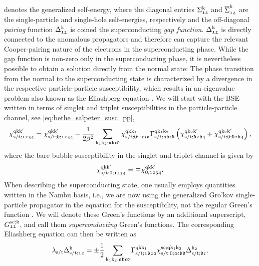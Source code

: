 \documentclass[\main/main.tex]{subfiles}
\begin{document}
denotes the generalized self-energy, where the diagonal entries $\Sigma_{\mathfrak{12}}^{\text{k}}$ and $\overline{\Sigma}_{\mathfrak{12}}^{\text{k}}$ are the single-particle and single-hole self-energies, respectively and the off-diagonal \textit{pairing} function $\Delta_{\mathfrak{12}}^{\text{k}}$ is coined the superconducting \textit{gap function}. $\Delta_{\mathfrak{12}}^{\text{k}}$ is directly connected to the anomalous propagators and therefore can capture the relevant Cooper-pairing nature of the electrons in the superconducting phase. While the gap function is non-zero only in the superconducting phase, it is nevertheless possible to obtain a solution directly from the normal state: The phase transition from the normal to the superconducting state is characterized by a divergence in the respective particle-particle susceptibility, which results in an eigenvalue problem also known as the Eliashberg equation \cite{Berges2016}. We will start with the BSE written in terms of singlet and triplet susceptibilities in the particle-particle channel, see \eqref{eq:bethe_salpeter_susc_pp},
\begin{align}
\chi^{\text{q}\text{k}\text{k}'}_{\text{s}/\text{t};\mathfrak{1234}}=\chi^{\text{q}\text{k}\text{k}'}_{\text{s}/\text{t};0;\mathfrak{1234}}-\frac{1}{2\beta^2}\sum_{\text{k}_1\text{k}_2;\mathfrak{abcd}}\chi^{\text{q}\text{k}\text{k}_1}_{\text{s}/\text{t};0;\mathfrak{1c3a}}\Gamma^{\text{q}\text{k}_1\text{k}_2}_{\text{s}/\text{t};\mathfrak{abcd}}\left (\chi^{\text{q}\text{k}_2\text{k}'}_{\text{s}/\text{t};\mathfrak{d2b4}}+\chi^{\text{q}\text{k}_2\text{k}'}_{\text{s}/\text{t};0;\mathfrak{d2b4}}\right ),
\end{align}
where the bare bubble susceptibility in the singlet and triplet channel is given by \cite{Gingras2019}
\begin{align}
	\chi^{\text{q}\text{k}\text{k}'}_{\text{s}/\text{t};0;\mathfrak{1234}}=\mp\chi^{\text{q}\text{k}\text{k}'}_{0;\mathfrak{1234}}.
\end{align}
When describing the superconducting state, one usually employs quantities written in the Nambu basis, i.e., we are now using the generalized Gro'kov single-particle propagator in the equation for the susceptibility, not the regular Green's function \cite{Nambu1950, Putzer2023}. We will denote these Green's functions by an additional superscript, $G^{\text{sc};\text{k}}_{\mathfrak{12}}$, and call them \textit{superconducting} Green's functions. The corresponding Eliashberg equation can then be written as
\begin{align}\label{eq:full_eliashberg}
	\lambda_{\text{s}/\text{t}}\Delta_{\text{s}/\text{t};\mathfrak{12}}^{\text{k}}=\pm\frac{1}{2}\sum_{\text{k}_1\text{k}_2;\mathfrak{abcd}}\Gamma^{\text{q}\text{k}\text{k}_1}_{\text{s}/\text{t};\mathfrak{1b2a}}\chi^{\text{sc};\text{q}\text{k}_1\text{k}_2}_{\text{s}/\text{t};0;\mathfrak{acbd}}\Delta_{\text{s}/\text{t};\mathfrak{dc}}^{\text{k}_2},
\end{align}
\end{document}
